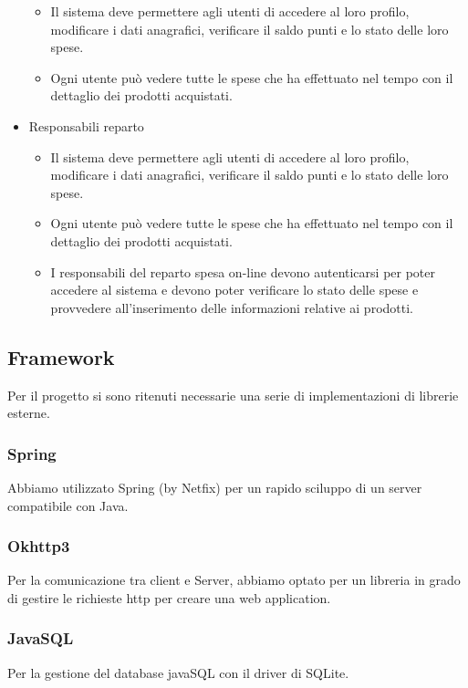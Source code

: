 \documentclass[12pt, a4paper]{article}
\numberwithin{equation}{section} %
\begin{document}
\begin{itemize}
	\begin{itemize}
	\item  Il  sistema  deve  permettere  agli  utenti  di  accedere  al  loro  profilo,  modificare  i  dati  anagrafici, verificare il saldo punti e lo stato delle loro spese.
	\item Ogni utente può vedere tutte le spese che ha effettuato nel tempo con il dettaglio dei prodotti acquistati.
	\end{itemize}
\item Responsabili reparto
	\begin{itemize}
	\item  Il  sistema  deve  permettere  agli  utenti  di  accedere  al  loro  profilo,  modificare  i  dati  anagrafici, verificare il saldo punti e lo stato delle loro spese.
	\item Ogni utente può vedere tutte le spese che ha effettuato nel tempo con il dettaglio dei prodotti acquistati.
	\item I responsabili del reparto spesa on-line devono autenticarsi per poter accedere al sistema e devono poter  verificare  lo  stato delle  spese  e  provvedere  all’inserimento delle  informazioni  relative  ai prodotti.
	\end{itemize}
\end{itemize}
	

\subsection{Framework}
Per il progetto si sono ritenuti necessarie una serie di implementazioni di librerie esterne.
\subsubsection{Spring}
Abbiamo utilizzato Spring (by Netfix) per un rapido sciluppo di un server compatibile con Java.
\subsubsection{Okhttp3}
Per la comunicazione tra client e Server, abbiamo optato per un libreria in grado di gestire le richieste http per creare una web application.
\subsubsection{JavaSQL}
Per la gestione del database javaSQL con il driver di SQLite.
\end{document}
